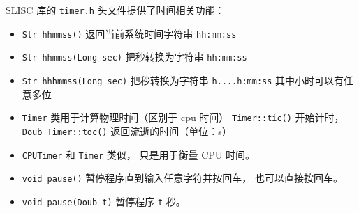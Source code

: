 

SLISC 库的 \verb`timer.h` 头文件提供了时间相关功能：
\begin{itemize}
\item \verb`Str hhmmss()` 返回当前系统时间字符串 \verb`hh:mm:ss`
\item \verb`Str hhmmss(Long sec)` 把秒转换为字符串 \verb`hh:mm:ss`
\item \verb`Str hhhmmss(Long sec)` 把秒转换为字符串 \verb`h....h:mm:ss` 其中小时可以有任意多位
\item \verb`Timer` 类用于计算物理时间（区别于 cpu 时间） \verb`Timer::tic()` 开始计时， \verb`Doub Timer::toc()` 返回流逝的时间（单位：s）
\item \verb`CPUTimer` 和 \verb`Timer` 类似， 只是用于衡量 CPU 时间。
\item \verb`void pause()` 暂停程序直到输入任意字符并按回车， 也可以直接按回车。
\item \verb`void pause(Doub t)` 暂停程序 \verb`t` 秒。
\end{itemize}
